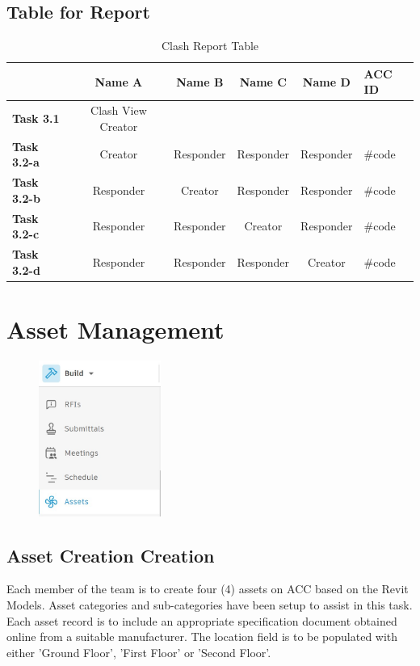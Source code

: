 \subsection{Table for Report}

\begin{table}[ht]
	\centering
	\begin{tabular}{|l|c|c|c|c|l|}
		\hline
		& \textbf{Name A} & \textbf{Name B} & \textbf{Name C} & \textbf{Name D} & \textbf{ACC ID}\\
		\hline
		\textbf{Task 3.1} & Clash View Creator &  &  &  & \\
		\hline
		\textbf{Task 3.2-a} & Creator & Responder & Responder & Responder & \#code\\
		\textbf{Task 3.2-b} & Responder & Creator & Responder & Responder & \#code\\
		\textbf{Task 3.2-c} & Responder & Responder & Creator & Responder & \#code\\
		\textbf{Task 3.2-d} & Responder & Responder & Responder & Creator & \#code\\
		\hline
	\end{tabular}
	\caption{Clash Report Table }
	\label{tab:clash-items}
\end{table}


\newpage
\section{Asset Management}

\begin{figure}[h!t]
	\includegraphics[width=4.0cm]{RevitAssets/assets}
	\label{fig:assets}
\end{figure}

\subsection{Asset Creation Creation}
\label{section:assetcreation}
Each member of the team is to create four (4) assets on ACC based on the Revit Models.  Asset categories and sub-categories have been setup to assist in this task.  Each asset record is to include an appropriate specification document obtained online from a suitable manufacturer.  The location field is to be populated with either 'Ground Floor', 'First Floor' or 'Second Floor'.


